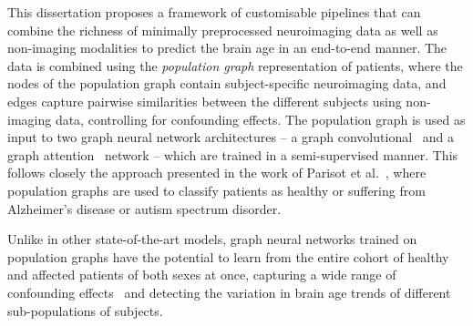 This dissertation proposes a framework of customisable pipelines that can combine the richness of minimally preprocessed neuroimaging data as well as non-imaging modalities to predict the brain age in an end-to-end manner. The data is combined using the \textit{population graph} representation of patients, where the nodes of the population graph contain subject-specific neuroimaging data, and edges capture pairwise similarities between the different subjects using non-imaging data, controlling for confounding effects. The population graph is used as input to two graph neural network architectures – a graph convolutional~\cite{kipf2017semi} and a graph attention~\cite{velickovic2018graph} network – which are trained in a semi-supervised manner. This follows closely the approach presented in the work of Parisot et al.~\cite{parisot2017spectral,parisot2018disease}, where population graphs are used to classify patients as healthy or suffering from Alzheimer's disease or autism spectrum disorder.

Unlike in other state-of-the-art models, graph neural networks trained on population graphs have the potential to learn from the entire cohort of healthy and affected patients of both sexes at once, capturing a wide range of confounding effects~\cite{ruigrok2014meta} and detecting the variation in brain age trends of different sub-populations of subjects. 




